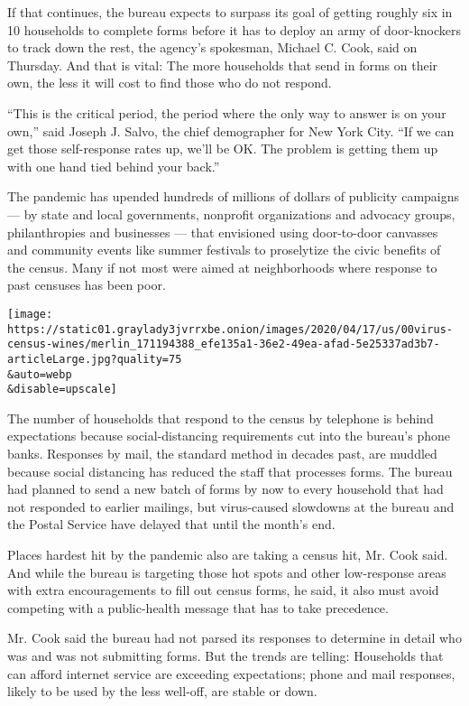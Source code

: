 If that continues, the bureau expects to surpass its goal of getting
roughly six in 10 households to complete forms before it has to deploy
an army of door-knockers to track down the rest, the agency's spokesman,
Michael C. Cook, said on Thursday. And that is vital: The more
households that send in forms on their own, the less it will cost to
find those who do not respond.

``This is the critical period, the period where the only way to answer
is on your own,'' said Joseph J. Salvo, the chief demographer for New
York City. ``If we can get those self-response rates up, we'll be OK.
The problem is getting them up with one hand tied behind your back.''

The pandemic has upended hundreds of millions of dollars of publicity
campaigns --- by state and local governments, nonprofit organizations
and advocacy groups, philanthropies and businesses --- that envisioned
using door-to-door canvasses and community events like summer festivals
to proselytize the civic benefits of the census. Many if not most were
aimed at neighborhoods where response to past censuses has been poor.

\texttt{[image: https://static01.graylady3jvrrxbe.onion/images/2020/04/17/us/00virus-census-wines/merlin\_171194388\_efe135a1-36e2-49ea-afad-5e25337ad3b7-articleLarge.jpg?quality=75\\\&auto=webp\\\&disable=upscale]}

The number of households that respond to the census by telephone is
behind expectations because social-distancing requirements cut into the
bureau's phone banks. Responses by mail, the standard method in decades
past, are muddled because social distancing has reduced the staff that
processes forms. The bureau had planned to send a new batch of forms by
now to every household that had not responded to earlier mailings, but
virus-caused slowdowns at the bureau and the Postal Service have delayed
that until the month's end.

Places hardest hit by the pandemic also are taking a census hit, Mr.
Cook said. And while the bureau is targeting those hot spots and other
low-response areas with extra encouragements to fill out census forms,
he said, it also must avoid competing with a public-health message that
has to take precedence.

Mr. Cook said the bureau had not parsed its responses to determine in
detail who was and was not submitting forms. But the trends are telling:
Households that can afford internet service are exceeding expectations;
phone and mail responses, likely to be used by the less well-off, are
stable or down.

